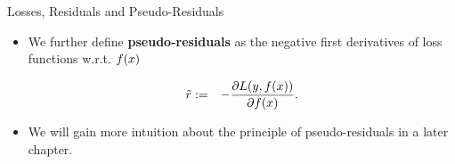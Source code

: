 \begin{vbframe}{Losses, Residuals and Pseudo-Residuals}
\begin{itemize}
\framebreak 

\item We further define \textbf{pseudo-residuals} as the negative first derivatives of loss functions w.r.t. $f(x)$

  \begin{eqnarray*}
    \tilde r &:=& - \frac{\partial \Lxy}{\partial \fx}.  %
  \end{eqnarray*}
\item We will gain more intuition about the principle of pseudo-residuals in a later chapter. 
\end{itemize}

\end{vbframe}



